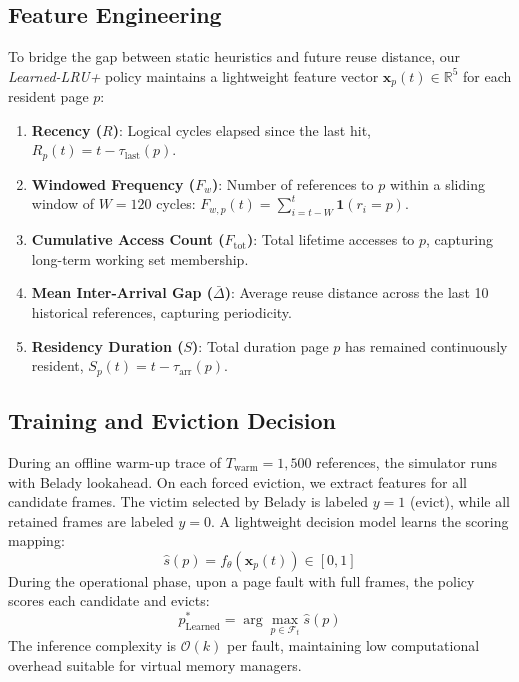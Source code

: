 \documentclass[10pt,twocolumn,a4paper]{article}
\begin{document}
\subsection{Feature Engineering}
To bridge the gap between static heuristics and future reuse distance, our \textit{Learned-LRU+} policy maintains a lightweight feature vector $\mathbf{x}_p(t) \in \mathbb{R}^5$ for each resident page $p$:
\begin{enumerate}
    \item \textbf{Recency ($R$)}: Logical cycles elapsed since the last hit, $R_p(t) = t - \tau_{\text{last}}(p)$.
    \item \textbf{Windowed Frequency ($F_w$)}: Number of references to $p$ within a sliding window of $W = 120$ cycles: $F_{w, p}(t) = \sum_{i=t-W}^{t} \mathbf{1}(r_i = p)$.
    \item \textbf{Cumulative Access Count ($F_{\text{tot}}$)}: Total lifetime accesses to $p$, capturing long-term working set membership.
    \item \textbf{Mean Inter-Arrival Gap ($\bar{\Delta}$)}: Average reuse distance across the last 10 historical references, capturing periodicity.
    \item \textbf{Residency Duration ($S$)}: Total duration page $p$ has remained continuously resident, $S_p(t) = t - \tau_{\text{arr}}(p)$.
\end{enumerate}

\subsection{Training and Eviction Decision}
During an offline warm-up trace of $T_{\text{warm}} = 1{,}500$ references, the simulator runs with Belady lookahead. On each forced eviction, we extract features for all candidate frames. The victim selected by Belady is labeled $y = 1$ (evict), while all retained frames are labeled $y = 0$. A lightweight decision model learns the scoring mapping:
\begin{equation}
\hat{s}(p) = f_\theta(\mathbf{x}_p(t)) \in [0, 1]
\end{equation}
During the operational phase, upon a page fault with full frames, the policy scores each candidate and evicts:
\begin{equation}
p^*_{\text{Learned}} = \arg\max_{p \in \mathcal{F}_t} \hat{s}(p)
\end{equation}
The inference complexity is $\mathcal{O}(k)$ per fault, maintaining low computational overhead suitable for virtual memory managers.
\end{document}
